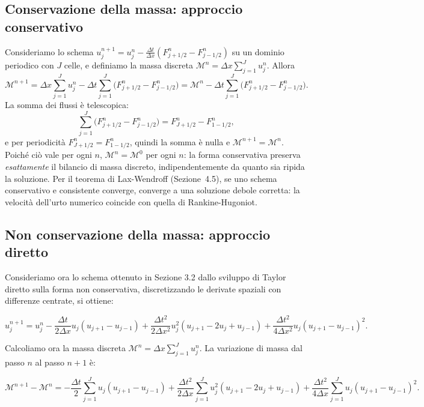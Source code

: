 \documentclass[12pt]{article}
\begin{document}
\newpage

\subsection{Conservazione della massa: approccio conservativo}

Consideriamo lo schema $u_j^{n+1}=u_j^n-\frac{\Delta t}{\Delta x}(F_{j+1/2}^n-F_{j-1/2}^n)$ su un dominio periodico con $J$ celle, e definiamo la massa discreta $\mathcal{M}^n=\Delta x\sum_{j=1}^J u_j^n$. Allora
\[
\mathcal{M}^{n+1} = \Delta x\sum_{j=1}^J u_j^n - \Delta t\sum_{j=1}^J\bigl(F_{j+1/2}^n-F_{j-1/2}^n\bigr) = \mathcal{M}^n - \Delta t\sum_{j=1}^J\bigl(F_{j+1/2}^n-F_{j-1/2}^n\bigr).
\]
La somma dei flussi è telescopica:
\[
\sum_{j=1}^J\bigl(F_{j+1/2}^n-F_{j-1/2}^n\bigr) = F_{J+1/2}^n - F_{1-1/2}^n,
\]
e per periodicità $F_{J+1/2}^n=F_{1-1/2}^n$, quindi la somma è nulla e $\mathcal{M}^{n+1}=\mathcal{M}^n$. Poiché ciò vale per ogni $n$, $\mathcal{M}^n=\mathcal{M}^0$ per ogni $n$: la forma conservativa preserva \emph{esattamente} il bilancio di massa discreto, indipendentemente da quanto sia ripida la soluzione. Per il teorema di Lax-Wendroff (Sezione~4.5), se uno schema conservativo e consistente converge, converge a una soluzione debole corretta: la velocità dell'urto numerico coincide con quella di Rankine-Hugoniot.

\newpage\subsection{Non conservazione della massa: approccio diretto}

Consideriamo ora lo schema ottenuto in Sezione 3.2 dallo sviluppo di Taylor diretto sulla forma non conservativa, discretizzando le derivate spaziali con differenze centrate, si ottiene:

\[
u_j^{n+1} = u_j^n - \frac{\Delta t}{2\Delta x} u_j (u_{j+1} - u_{j-1}) 
+ \frac{\Delta t^2}{2\Delta x^2} u_j^2 (u_{j+1} - 2u_j + u_{j-1}) 
+ \frac{\Delta t^2}{4\Delta x^2} u_j (u_{j+1} - u_{j-1})^2.
\]

Calcoliamo ora la massa discreta \(\mathcal{M}^n = \Delta x \sum_{j=1}^J u_j^n\). La variazione di massa dal passo \(n\) al passo \(n+1\) è:

\[
\mathcal{M}^{n+1} - \mathcal{M}^n = 
- \frac{\Delta t}{2} \sum_{j=1}^J u_j (u_{j+1} - u_{j-1}) 
+ \frac{\Delta t^2}{2\Delta x} \sum_{j=1}^J u_j^2 (u_{j+1} - 2u_j + u_{j-1}) 
+ \frac{\Delta t^2}{4\Delta x} \sum_{j=1}^J u_j (u_{j+1} - u_{j-1})^2.
\]
\end{document}

